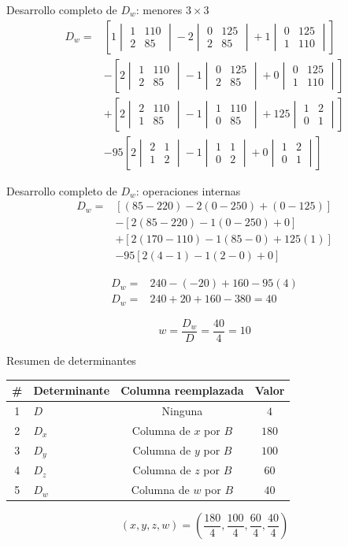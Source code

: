 \documentclass[aspectratio=169]{beamer}
\newcommand{\detm}[1]{\begin{vmatrix}#1\end{vmatrix}}
\begin{document}
\begin{frame}[shrink=16]{Desarrollo completo de $D_w$: menores $3\times3$}
\[
\begin{aligned}
D_w={}&\left[1\detm{1&110\\2&85}-2\detm{0&125\\2&85}+1\detm{0&125\\1&110}\right]\\
&-\left[2\detm{1&110\\2&85}-1\detm{0&125\\2&85}+0\detm{0&125\\1&110}\right]\\
&+\left[2\detm{2&110\\1&85}-1\detm{1&110\\0&85}+125\detm{1&2\\0&1}\right]\\
&-95\left[2\detm{2&1\\1&2}-1\detm{1&1\\0&2}+0\detm{1&2\\0&1}\right]
\end{aligned}
\]
\end{frame}

\begin{frame}[shrink=13]{Desarrollo completo de $D_w$: operaciones internas}
\[
\begin{aligned}
D_w={}&[(85-220)-2(0-250)+(0-125)]\\
&-[2(85-220)-1(0-250)+0]\\
&+[2(170-110)-1(85-0)+125(1)]\\
&-95[2(4-1)-1(2-0)+0]
\end{aligned}
\]

\[
\begin{aligned}
D_w={}&240-(-20)+160-95(4)\\
D_w={}&240+20+160-380=\boxed{40}
\end{aligned}
\]

\[
w=\frac{D_w}{D}=\frac{40}{4}=\boxed{10}
\]
\end{frame}


\begin{frame}{Resumen de determinantes}
\begin{table}
\centering
\begin{tabular}{clcc}
\toprule
\# & Determinante & Columna reemplazada & Valor \\
\midrule
1 & $D$ & Ninguna & $4$ \\
2 & $D_x$ & Columna de $x$ por $B$ & $180$ \\
3 & $D_y$ & Columna de $y$ por $B$ & $100$ \\
4 & $D_z$ & Columna de $z$ por $B$ & $60$ \\
5 & $D_w$ & Columna de $w$ por $B$ & $40$ \\
\bottomrule
\end{tabular}
\end{table}

\[
(x,y,z,w)=\left(\frac{180}{4},\frac{100}{4},\frac{60}{4},\frac{40}{4}\right)
\]
\end{frame}
\end{document}
